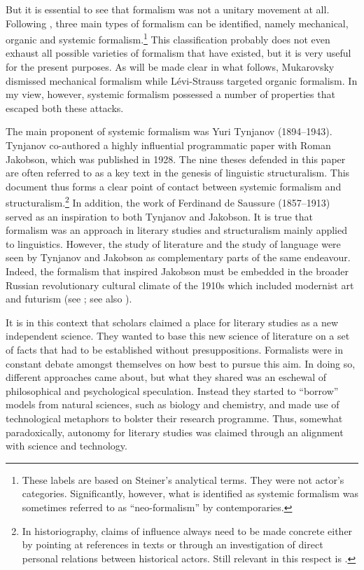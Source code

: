 \documentclass[output=paper]{langscibook}
\begin{document}
But it is essential to see that formalism was not a unitary movement at all. Following \citet{Steiner1984}, three main types of formalism can be identified, namely mechanical, organic and systemic formalism.\footnote{These labels are based on Steiner's analytical terms. They were not actor’s categories. Significantly, however, what is identified as systemic formalism was sometimes referred to as ``neo-formalism'' by contemporaries.} This classification probably does not even exhaust all possible varieties of formalism that have existed, but it is very useful for the present purposes. As will be made clear in what follows, Mukarovsky dismissed mechanical formalism while Lévi-Strauss targeted organic formalism. In my view, however, systemic formalism possessed a number of properties that escaped both these attacks. 

The main proponent of systemic formalism was Yuri Tynjanov (1894--1943). Tynjanov co-authored a highly influential programmatic paper with Roman Jakobson, which was published in 1928. The nine theses defended in this paper are often referred to as a key text in the genesis of linguistic structuralism. This document thus forms a clear point of contact between systemic formalism and structuralism.\footnote{In historiography, claims of influence always need to be made concrete either by pointing at references in texts or through an investigation of direct personal relations between historical actors. Still relevant in this respect is \citet{Koerner1989}.} In addition, the work of Ferdinand de Saussure (1857--1913) served as an inspiration to both Tynjanov and Jakobson. It is true that formalism was an approach in literary studies and structuralism mainly applied to linguistics. However, the study of literature and the study of language were seen by Tynjanov and Jakobson as complementary parts of the same endeavour. Indeed, the formalism that inspired Jakobson must be embedded in the broader Russian revolutionary cultural climate of the 1910s which included modernist art and futurism (see \citealt[32--33]{Holenstein1975}; see also \citealt{Karstens2017lonely}). 

It is in this context that scholars claimed a place for literary studies as a new independent science. They wanted to base this new science of literature on a set of facts that had to be established without presuppositions. Formalists were in constant debate amongst themselves on how best to pursue this aim. In doing so, different approaches came about, but what they shared was an eschewal of philosophical and psychological speculation. Instead they started to ``borrow'' models from natural sciences, such as biology and chemistry, and made use of technological metaphors to bolster their research programme. Thus, somewhat paradoxically, autonomy for literary studies was claimed through an alignment with science and technology. 
\end{document}

